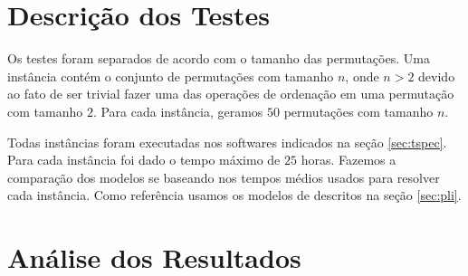 \section{Descrição dos Testes}
\label{sec:testes}
Os testes foram separados de acordo com o tamanho das
permutações. Uma instância contém o conjunto de permutações com
tamanho $n$, onde $n > 2$ devido ao fato de ser trivial fazer uma das
operações de ordenação em uma permutação com tamanho $2$. Para cada
instância, geramos $50$ permutações com tamanho $n$.

Todas instâncias foram executadas nos softwares indicados na
seção \ref{sec:tspec}. Para cada instância foi dado o tempo máximo de
$25$ horas. Fazemos a comparação dos modelos se baseando nos tempos
médios usados para resolver cada instância. Como referência usamos os
modelos de \pli{} descritos na seção \ref{sec:pli}.

\section{Análise dos Resultados}
\label{sec:analise}









